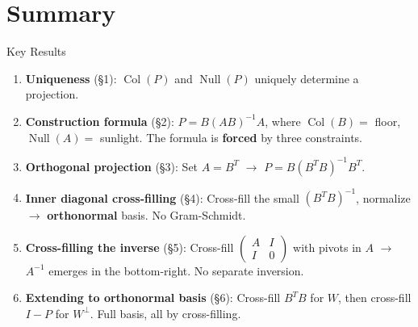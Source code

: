 \documentclass[10pt]{beamer}
\theoremstyle{definition}
\newcommand{\x}[1]{\alert{\textbf{#1}}}
\begin{document}
\section{Summary}

\begin{frame}{Key Results}

\begin{enumerate}
\item \x{Uniqueness} (\S1): $\operatorname{Col}(P)$ and $\operatorname{Null}(P)$ uniquely determine a projection.

\vspace{0.3em}

\item \x{Construction formula} (\S2): $P = B(AB)^{-1}A$, where $\operatorname{Col}(B) = $ floor, $\operatorname{Null}(A) = $ sunlight. The formula is \x{forced} by three constraints.

\vspace{0.3em}

\item \x{Orthogonal projection} (\S3): Set $A = B^T$ $\to$ $P = B(B^TB)^{-1}B^T$.

\vspace{0.3em}

\item \x{Inner diagonal cross-filling} (\S4): Cross-fill the small $(B^TB)^{-1}$, normalize $\to$ \x{orthonormal} basis. No Gram-Schmidt.

\vspace{0.3em}

\item \x{Cross-filling the inverse} (\S5): Cross-fill $\left(\begin{smallmatrix} A & I \\ I & 0 \end{smallmatrix}\right)$ with pivots in $A$ $\to$ $A^{-1}$ emerges in the bottom-right. No separate inversion.

\vspace{0.3em}

\item \x{Extending to orthonormal basis} (\S6): Cross-fill $B^TB$ for $W$, then cross-fill $I - P$ for $W^\perp$. Full basis, all by cross-filling.
\end{enumerate}

\end{frame}
\end{document}
